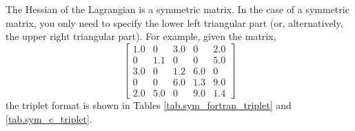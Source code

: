 \documentclass[10pt]{article}
\begin{document}
The Hessian of the Lagrangian is a symmetric matrix. In the case of a
symmetric matrix, you only need to specify the lower left triangular
part (or, alternatively, the upper right triangular part). For
example, given the matrix,
\begin{equation}
\label{eqn.ex_sym_matrix}
\left[
\begin{array}{ccccccc}
1.0	& 0	& 3.0	& 0	& 2.0 	\\
0	& 1.1	& 0	& 0	& 5.0	\\
3.0	& 0	& 1.2	& 6.0	& 0	\\
0	& 0	& 6.0	& 1.3	& 9.0	\\
2.0	& 5.0	& 0	& 9.0	& 1.4
\end{array}
\right]
\end{equation}
the triplet format is shown in Tables \ref{tab.sym_fortran_triplet}
and \ref{tab.sym_c_triplet}.
\end{document}
